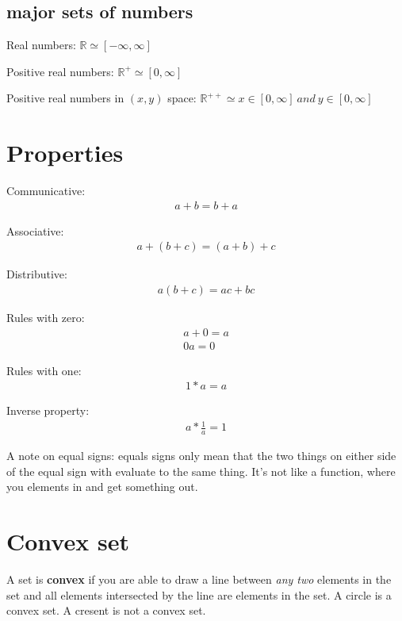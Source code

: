 \documentclass{article}
\begin{document}
\subsection{major sets of numbers}

Real numbers: $\mathbb{R} \simeq [- \infty, \infty]$

Positive real numbers: $\mathbb{R}^+ \simeq [0, \infty]$

Positive real numbers in $(x,y)$ space: $\mathbb{R}^{++} \simeq  x \in [0, \infty]\ and\ y \in [0, \infty]$

\section{Properties}
Communicative:
\begin{align*}
    a+b = b+ a
\end{align*}

Associative: 
\begin{align*}
    a+ (b+c) = (a+b) +c
\end{align*}

Distributive:
\begin{align*}
    a(b+c) = ac+ bc
\end{align*}

Rules with zero:
\begin{align*}
    a+ 0 = a \\
    0a = 0
\end{align*}

Rules with one:
\begin{align*}
    1*a = a
\end{align*}

Inverse property:
\begin{align*}
    a* \frac{1}{a} = 1
\end{align*}

A note on equal signs: equals signs only mean that the two things on either side of the equal sign with evaluate to the same thing. It's not like a function, where you elements in and get something out. 

\section{Convex set}
A set is \textbf{convex} if you are able to draw a line between \textit{any two} elements in the set and all elements intersected by the line are elements in the set. A circle is a convex set. A cresent is not a convex set. \\
\end{document}
